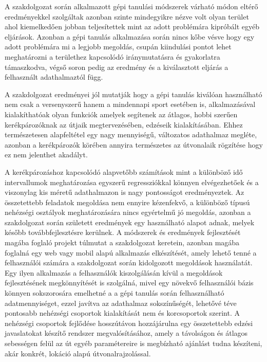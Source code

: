 \label{Chap:osszefoglalas}
\iffalse 
Ebben a fejezetben kell összefoglalni a szakdolgozat eredményeit, sajátosságait és a témában való elhelyezkedését. A fejezet címe nem módosítható! Lehet benne több alfejezet is, de nem ajánlott. Min 1 max 4 oldal terjedelemben
\fi

A szakdolgozat során alkalmazott gépi tanulási módszerek várható módon eltérő eredményekkel szolgáltak azonban szinte mindegyikre nézve volt olyan terület ahol kiemelkedően jobban teljesítettek mint az adott problémára kipróbált egyéb eljárások. Azonban a gépi tanulás alkalmazása során nincs kőbe vésve hogy egy adott problémára mi a legjobb megoldás, csupán kiindulási pontot lehet meghatározni a területhez kapcsolódó iránymutatásra és gyakorlatra támaszkodva, végső soron pedig az eredmény és a kiválasztott eljárás a felhasznált adathalmaztól függ. 

A szakdolgozat eredményei jól mutatják hogy a gépi tanulás kiválóan használható nem csak a versenyszerű hanem a mindennapi sport esetében is, alkalmazásával kialakíthatóak olyan funkciók amelyek segítenek az átlagos, hobbi szerűen kerékpározóknak az útjaik megtervezésében, edzéseik kialakításában. Ehhez természetesen alapfeltétel egy nagy mennyiségű, változatos adathalmaz megléte, azonban a kerékpározók körében annyira természetes az útvonalaik rögzítése hogy ez nem jelenthet akadályt.

A kerékpározáshoz kapcsolódó alapvetőbb számítások mint a különböző idő intervallumok meghatározása egyszerű regressziókkal könnyen elvégezhetőek és a viszonylag kis méretű adathalmazon is nagy pontosságot eredményeztek. Az összetettebb feladatok megoldása nem ennyire kézenfekvő, a különböző típusú nehézségi osztályok meghatározására nincs egyértelmű jó megoldás, azonban a szakdolgozat során született eredmények egy használható alapot adnak, melyek később továbbfejlesztésre kerülnek. A módszerek és eredmények fejlesztését magába foglaló projekt túlmutat a szakdolgozat keretein, azonban magába foglalná egy web vagy mobil alapú alkalmazás elkészítését, amely lehető tenné a felhasználói számára a szakdolgozat során kidolgozott megoldások használatát. Egy ilyen alkalmazás a felhasználók kiszolgálásán kívül a megoldások fejlesztésének megkönnyítését is szolgálná, mivel egy növekvő felhasználói bázis könnyen sokszorosára emelhetné a a gépi tanulás során felhasználható adatmennyiséget, ezzel javítva az adathalmaz sokszínűségét, lehetővé téve pontosabb nehézségi csoportok kialakítását nem és korcsoportok szerint. A nehézségi csoportok fejlődése hosszútávon hozzájárulna egy összetettebb edzési javaslatokat készítő rendszer megvalósításához, amely a távolságon és átlagos sebességen felül az út egyéb paramétereire is megbízható ajánlást tudna készíteni, akár konkrét, lokáció alapú útvonalrajzolással.


